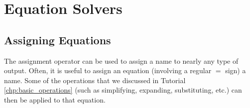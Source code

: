 \chapter{Equation Solvers}
\label{chp:equation_solvers}		

\section{Assigning Equations}
\label{sec:assigning_equations}

The assignment operator \text{:=} can be used to assign a name to nearly any type of output. Often, it is useful to assign an equation (involving a regular $=$ sign) a name. Some of the operations that we discussed in Tutorial \ref{chp:basic_operations} (such as simplifying, expanding, substituting, etc.) can then be applied to that equation.


\begin{maplegroup}
\begin{mapleinput}
\end{mapleinput}
\mapleresult
\begin{maplelatex}
\end{maplelatex}
\end{maplegroup}


\begin{maplegroup}
\begin{mapleinput}
\end{mapleinput}
\mapleresult
\begin{maplelatex}
\end{maplelatex}
\end{maplegroup}

\begin{maplegroup}
\begin{mapleinput}
\end{mapleinput}
\mapleresult
\begin{maplelatex}
\end{maplelatex}
\end{maplegroup}

